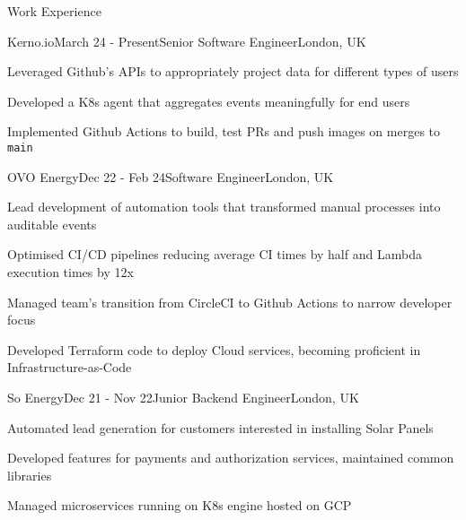 \documentclass{resume} %
\begin{document}
\begin{rSection}{Work Experience}
    \begin{rSubsection}{Kerno.io}{March 24 - Present}{Senior Software Engineer}{London, UK}
    \item Leveraged Github's APIs to appropriately project data for different types of users    
    \item Developed a K8s agent that aggregates events meaningfully for end users
    \item Implemented Github Actions to build, test PRs and push images on merges to \texttt{main}
  \end{rSubsection}
  \begin{rSubsection}{OVO Energy}{Dec 22 - Feb 24}{Software Engineer}{London, UK}
    \item Lead development of automation tools that transformed manual processes into auditable events
    \item Optimised CI/CD pipelines reducing average CI times by half and Lambda execution times by 12x 
    \item Managed team’s transition from CircleCI to Github Actions to narrow developer focus
    \item Developed Terraform code to deploy Cloud services, becoming proficient in Infrastructure-as-Code
  \end{rSubsection}
  \begin{rSubsection}{So Energy}{Dec 21 - Nov 22}{Junior Backend Engineer}{London, UK}
    \item Automated lead generation for customers interested in installing Solar Panels
    \item Developed features for payments and authorization services, maintained common libraries
    \item Managed microservices running on K8s engine hosted on GCP
  \end{rSubsection}

\end{rSection}
\end{document}
